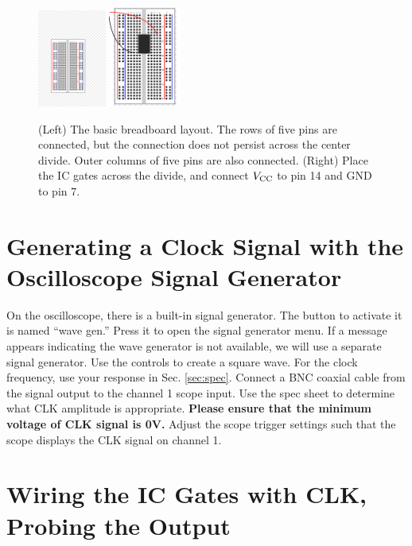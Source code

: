 \documentclass{article}
\begin{document}
\begin{figure}[ht]
\centering
\includegraphics[width=0.20\textwidth,trim=5cm 6cm 9cm 13cm,clip=true]{breadboard.jpg} \hspace{0.5cm}
\includegraphics[width=0.21\textwidth]{breadboard_power.pdf}
\caption{\label{fig:count2} (Left) The basic breadboard layout.  The rows of five pins are connected, but the connection does not persist across the center divide.  Outer columns of five pins are also connected. (Right) Place the IC gates across the divide, and connect $V_{\rm CC}$ to pin 14 and GND to pin 7.}
\end{figure}

\section{Generating a Clock Signal with the Oscilloscope Signal Generator}

On the oscilloscope, there is a built-in signal generator.  The button to activate it is named ``wave gen.''  Press it to open the signal generator menu.  If a message appears indicating the wave generator is not available, we will use a separate signal generator.  Use the controls to create a square wave.  For the clock frequency, use your response in Sec. \ref{sec:spec}.  Connect a BNC coaxial cable from the signal output to the channel 1 scope input.  Use the spec sheet to determine what CLK amplitude is appropriate.  \textbf{Please ensure that the minimum voltage of CLK signal is 0V.}  Adjust the scope trigger settings such that the scope displays the CLK signal on channel 1.

\section{Wiring the IC Gates with CLK, Probing the Output}
\end{document}
